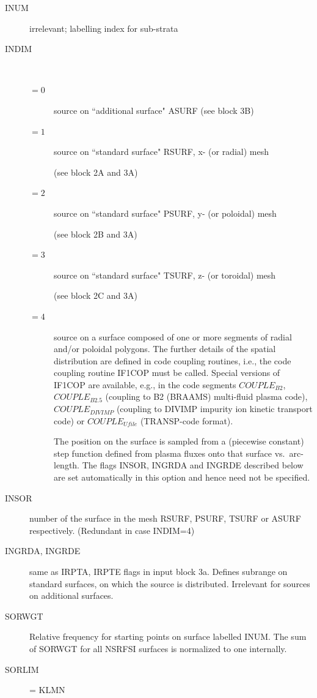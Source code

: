 \begin{description}
  \item[INUM] irrelevant; labelling index for sub-strata
  \item[INDIM] ~

        \begin{description}
          \item[$= 0$] source on ``additional surface" ASURF (see
                block 3B)
          \item[$= 1$] source on ``standard surface" RSURF, x- (or radial) mesh

                (see block 2A and 3A)
          \item[$= 2$] source on ``standard surface" PSURF, y- (or
                poloidal) mesh 

                (see block 2B and 3A)
          \item[$= 3$] source on ``standard surface" TSURF, z- (or
                toroidal) mesh 

                (see block 2C and 3A)
          \item[$= 4$] source on a surface composed of one or more
                segments of radial and/or poloidal polygons.
                The further details of the spatial distribution are defined in code coupling
                routines, i.e., the code coupling routine IF1COP must be called.
                Special versions of IF1COP are available, e.g., in the code segments
                $COUPLE_{B2}$, $COUPLE_{B2.5}$ (coupling to B2 (BRAAMS) multi-fluid plasma
                code), $COUPLE_{DIVIMP}$ (coupling to DIVIMP impurity ion kinetic transport
                code) or  $COUPLE_{Ufile}$ (TRANSP-code format).

                The position on the surface is sampled from a (piecewise constant) step
                function defined from plasma fluxes onto that surface vs.\ arc-length.
                The flags INSOR, INGRDA and INGRDE described below are set automatically in
                this option and hence need not be specified.
        \end{description}
  \item[INSOR] number of the surface in the mesh RSURF, PSURF, TSURF or ASURF
        respectively.
        (Redundant in case INDIM=4)
  \item[INGRDA, INGRDE] same as IRPTA, IRPTE flags in
        input block 3a.
        Defines subrange on standard surfaces, on which the source is distributed.
        Irrelevant for sources on additional surfaces.
  \item[SORWGT] Relative frequency for starting points on surface labelled INUM.
        The sum  of SORWGT for all NSRFSI surfaces is normalized to one internally.
  \item[SORLIM] = KLMN 


\end{description}

